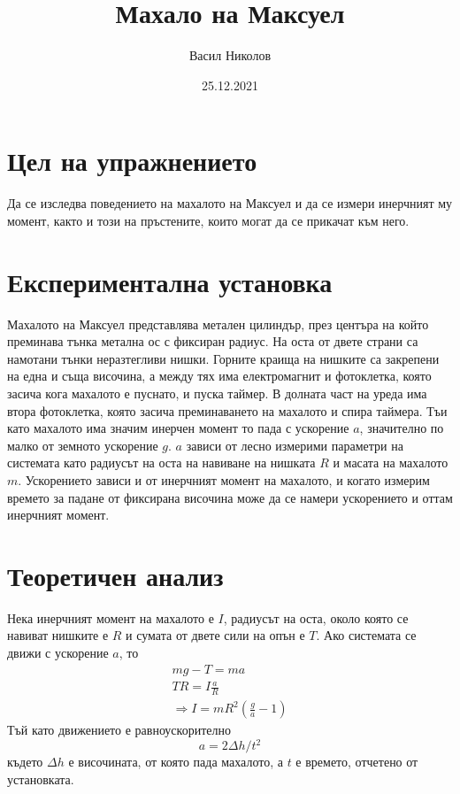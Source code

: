 \documentclass[aps, prb, twocolumn, a4paper, floatfix, reprint]{revtex4-2}
\begin{document}
\title{Махало на Максуел}
\author{Васил Николов}
\noaffiliation
\date{25.12.2021}
\maketitle

\section{Цел на упражнението}
Да се изследва поведението на махалото на Максуел и да се измери инерчният му момент, както и този на пръстените, които могат да се прикачат към него. 

\section{Експериментална установка}
Махалото на Максуел представлява метален цилиндър, през центъра на който преминава тънка метална ос с фиксиран радиус. На оста от двете страни са намотани тънки неразтегливи нишки. Горните краища на нишките са закрепени на една и съща височина, а между тях има електромагнит и фотоклетка, която засича кога махалото е пуснато, и пуска таймер. В долната част на уреда има втора фотоклетка, която засича преминаването на махалото и спира таймера. Тъи като махалото има значим инерчен момент то пада с ускорение $a$, значително по малко от земното ускорение $g$. $a$ зависи от лесно измерими параметри на системата като радиусът на оста на навиване на нишката $R$ и масата на махалото $m$. Ускорението зависи и от инерчният момент на махалото, и когато измерим времето за падане от фиксирана височина може да се намери ускорението и оттам инерчният момент. 

\section{Теоретичен анализ}
Нека инерчният момент на махалото е $I$, радиусът на оста, около която се навиват нишките е $R$ и сумата от двете сили на опън е $T$. Ако системата се движи с ускорение $a$, то
\begin{gather*}
    mg - T = ma \\
    TR = I\frac{a}{R} \\
    \Rightarrow I=mR^2(\frac{g}{a} - 1) \label{eq:1} \tag{1}
\end{gather*}
Тъй като движението е равноускорително 
\begin{equation*}
    a = 2\Delta h/t^2 \label{eq:2} \tag{2}
\end{equation*}
където $\Delta h$ е височината, от която пада махалото, а $t$ е времето, отчетено от установката. 
\end{document}
